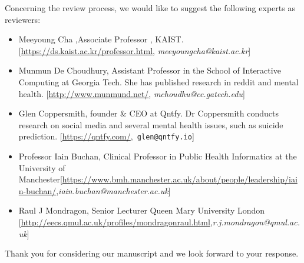 \documentclass[11pt,a4paper,roman]{moderncv}        %
\begin{document}
  
   Concerning the review process, we would like to suggest the following experts as reviewers:
   \begin{itemize}
        \item Meeyoung Cha ,Associate Professor , KAIST. [\url{https://ds.kaist.ac.kr/professor.html}, \textit{meeyoungcha@kaist.ac.kr}]
        \item Munmun De Choudhury, Assistant Professor in the School of Interactive Computing at Georgia Tech. She has published research in reddit and mental health. [\url{http://www.munmund.net/}, \textit{mchoudhu@cc.gatech.edu}]
        \item Glen Coppersmith, founder \& CEO at Qntfy. Dr Coppersmith conducts research on social media and several mental health issues, such as suicide prediction. [\url{https://qntfy.com/},\texttt{ glen@qntfy.io}]
        \item Professor Iain Buchan, Clinical Professor in Public Health Informatics at the University of Manchester[\url{https://www.bmh.manchester.ac.uk/about/people/leadership/iain-buchan/},\textit{iain.buchan@manchester.ac.uk}]
        \item Raul J Mondragon, Senior Lecturer Queen Mary University London [\url{http://eecs.qmul.ac.uk/profiles/mondragonraul.html},\textit{r.j.mondragon@qmul.ac.uk}] 
  
    \end{itemize}
  
   Thank you for considering our manuscript and we look forward to your response.
   
   \makeletterclosing
    
\end{document}

